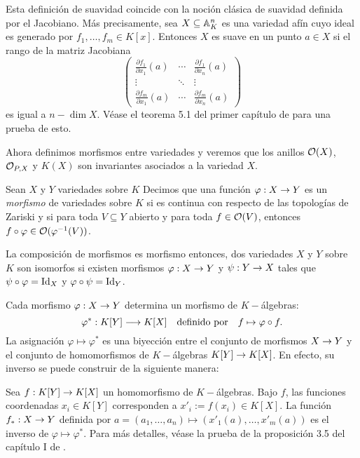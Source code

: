\begin{nota}
	Esta definición de suavidad coincide con la noción clásica de suavidad definida por el Jacobiano. Más precisamente, sea $X\subseteq\mathbb{A}^n_K$ es una variedad afín cuyo ideal es generado por $f_1,\ldots,f_m\in K[x]$. Entonces $X$ es suave en un punto $a\in X$ si el rango de la matriz Jacobiana
	\[
		\begin{pmatrix}
		\tfrac{\partial f_1}{\partial x_1}(a) & \cdots & \tfrac{\partial f_1}{\partial x_n}(a) \\
		\vdots & \ddots & \vdots \\
		\tfrac{\partial f_m}{\partial x_1}(a) & \cdots & \tfrac{\partial f_m}{\partial x_n}(a)
		\end{pmatrix}
	\]
	es igual a $n-\dim X$. Véase el teorema 5.1 del primer capítulo de \cite{HartshorneAG} para una prueba de esto.
\end{nota}

Ahora definimos morfismos entre variedades y veremos que los anillos $\mathcal{O}(X)$, $\mathcal{O}_{P,X}$ y $K(X)$ son invariantes asociados a la variedad $X$.

\begin{defin}
	Sean $X$ y $Y$ variedades sobre $K$ Decimos que una función $\varphi:X\rightarrow Y$ es un \emph{morfismo} de variedades sobre $K$ si es continua con respecto de las topologías de Zariski y si para toda $V\subseteq Y$ abierto y para toda $f\in\mathcal{O}(V)$, entonces $f\circ\varphi\in\mathcal{O}(\varphi^{-1}(V))$.
\end{defin}

\begin{nota}
	La composición de morfismos es morfismo entonces, dos variedades $X$ y $Y$ sobre $K$ son isomorfos si existen morfismos $\varphi:X\rightarrow Y$ y $\psi: Y\rightarrow X$ tales que $\psi\circ\varphi=\mathrm{Id}_X$ y $\varphi\circ\psi=\mathrm{Id}_Y$.
\end{nota}

Cada morfismo $\varphi: X\rightarrow Y$ determina un morfismo de $K-$álgebras:
\begin{equation}\label{eq:morf-inducido-coord}
	\varphi^*:K[Y]\longrightarrow K[X] \quad\text{definido por}\quad f\mapsto\varphi\circ f.
\end{equation}
La asignación $\varphi\mapsto\varphi^*$ es una biyección entre el conjunto de morfismos $X\rightarrow Y$ y el conjunto de homomorfismos de $K-$álgebras $K[Y]\rightarrow K[X]$. En efecto, su inverso se puede construir de la siguiente manera:

Sea $f:K[Y]\rightarrow K[X]$ un homomorfismo de $K-$álgebras. Bajo $f$, las funciones coordenadas $x_i\in K[Y]$ corresponden a $x'_i:=f(x_i)\in K[X]$. La función $f_*:X\rightarrow Y$ definida por $a=(a_1,\ldots,a_n)\mapsto(x'_1(a),\ldots,x'_m(a))$ es el inverso de $\varphi\mapsto \varphi^*$. Para más detalles, véase la prueba de la proposición 3.5 del capítulo I de \cite{HartshorneAG}.

